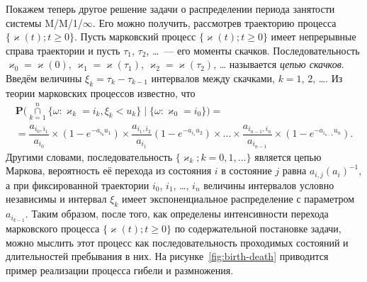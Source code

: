 \documentclass[12pt]{extarticle}
\renewcommand{\Pr}{{\mathbf P}}
\begin{document}
Покажем теперь другое решение задачи о распределении периода занятости системы
M/M/1/$\infty$. Его можно получить, рассмотрев траекторию процесса
$\{\varkappa(t); t\geqslant0\}$. Пусть марковский процесс $\{\varkappa(t);
t\geqslant0\}$ имеет непрерывные справа траектории и пусть $\tau_1$, $\tau_2$,
\ldots{}~--- его моменты скачков. Последовательность $\varkappa_0=\varkappa(0)$,
$\varkappa_1=\varkappa(\tau_1)$, $\varkappa_2=\varkappa(\tau_2)$, \ldots{}
называется \emph{цепью скачков}. Введём величины $\xi_k=\tau_k-\tau_{k-1}$
интервалов между скачками, $k=1$, $2$, \ldots{}. Из теории марковских процессов
известно, что
\begin{multline*}
  \Pr\bigl( \mathop{\cap}\limits_{k=1}^n \{\omega\colon
  \varkappa_k=i_k, \xi_k<u_k
  \}\mid\{\omega\colon \varkappa_0=i_0\}\bigr)=
  \\ =
  \dfrac{a_{i_0,i_1}}{a_{i_0}}\times (1-e^{-a_{i_0} u_1})\times
  \dfrac{a_{i_1,i_2}}{a_{i_1}} (1-e^{-a_{i_1} u_2}) \times \ldots\times
  \dfrac{a_{i_{n-1},i_n}}{a_{i_{n-1}}} \times(1-e^{-a_{i_{n-1}} u_n}).
\end{multline*}
Другими словами, последовательность $\{\varkappa_k; k=0, 1, \ldots\}$ является
цепью Маркова, вероятность её перехода  из состояния $i$ в состояние $j$ равна
$a_{i,j}(a_i)^{-1}$, а при фиксированной траектории $i_0$, $i_1$, \ldots, $i_n$
величины интервалов условно независимы и интервал $\xi_k$ имеет экспоненциальное
распределение с параметром~$a_{i_{k-1}}$. Таким образом, после того, как
определены интенсивности перехода марковского процесса $\{\varkappa(t);
t\geqslant0\}$ по содержательной постановке задачи, можно мыслить этот процесс
как последовательность проходимых состояний и длительностей пребывания в них. На
рисунке~\ref{fig:birth-death} приводится пример реализации процесса гибели и
размножения. 
\end{document}
